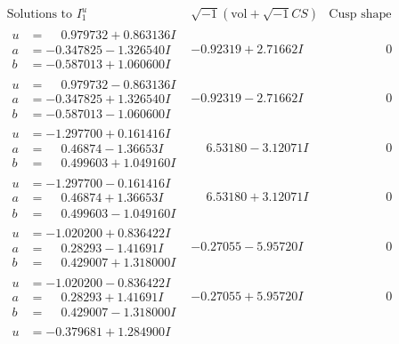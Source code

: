 \documentclass[1p]{elsarticle_modified}
\theoremstyle{definition}
\newcommand{\I}{\sqrt{-1}}
\begin{document}
$$\begin{array}{c|c|c}
\text{Solutions to }I^u_{1}& \I (\text{vol} + \sqrt{-1}CS) & \text{Cusp shape}\\
 \hline 
\begin{aligned}
u &= \phantom{-}0.979732 + 0.863136 I \\
a &= -0.347825 - 1.326540 I \\
b &= -0.587013 + 1.060600 I\end{aligned}
 & -0.92319 + 2.71662 I & \phantom{-0.000000 } 0 \\ \hline\begin{aligned}
u &= \phantom{-}0.979732 - 0.863136 I \\
a &= -0.347825 + 1.326540 I \\
b &= -0.587013 - 1.060600 I\end{aligned}
 & -0.92319 - 2.71662 I & \phantom{-0.000000 } 0 \\ \hline\begin{aligned}
u &= -1.297700 + 0.161416 I \\
a &= \phantom{-}0.46874 - 1.36653 I \\
b &= \phantom{-}0.499603 + 1.049160 I\end{aligned}
 & \phantom{-}6.53180 - 3.12071 I & \phantom{-0.000000 } 0 \\ \hline\begin{aligned}
u &= -1.297700 - 0.161416 I \\
a &= \phantom{-}0.46874 + 1.36653 I \\
b &= \phantom{-}0.499603 - 1.049160 I\end{aligned}
 & \phantom{-}6.53180 + 3.12071 I & \phantom{-0.000000 } 0 \\ \hline\begin{aligned}
u &= -1.020200 + 0.836422 I \\
a &= \phantom{-}0.28293 - 1.41691 I \\
b &= \phantom{-}0.429007 + 1.318000 I\end{aligned}
 & -0.27055 - 5.95720 I & \phantom{-0.000000 } 0 \\ \hline\begin{aligned}
u &= -1.020200 - 0.836422 I \\
a &= \phantom{-}0.28293 + 1.41691 I \\
b &= \phantom{-}0.429007 - 1.318000 I\end{aligned}
 & -0.27055 + 5.95720 I & \phantom{-0.000000 } 0 \\ \hline\begin{aligned}
u &= -0.379681 + 1.284900 I \\

\end{aligned}
\end{array}$$
\end{document}
